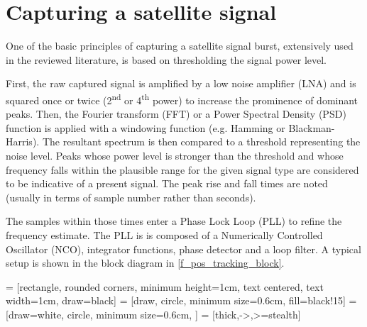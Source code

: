 \section{Capturing a satellite signal}
\label{s_pos_tracking_satellite}
One of the basic principles of capturing a satellite signal burst, extensively used in the reviewed literature, is based on thresholding the signal power level.

First, the raw captured signal is amplified by a low noise amplifier (LNA) and is squared once or twice (2\textsuperscript{nd} or 4\textsuperscript{th} power) to increase the prominence of dominant peaks. Then, the Fourier transform (FFT) or a Power Spectral Density (PSD) function is applied with a windowing function (e.g. Hamming or Blackman-Harris). The resultant spectrum is then compared to a threshold representing the noise level. Peaks whose power level is stronger than the threshold and whose frequency falls within the plausible range for the given signal type are considered to be indicative of a present signal. The peak rise and fall times are noted (usually in terms of sample number rather than seconds). 

The samples within those times enter a Phase Lock Loop (PLL) to refine the frequency estimate. The PLL is is composed of a Numerically Controlled Oscillator
(NCO), integrator functions, phase detector and a loop filter. A typical setup is shown in the block diagram in \autoref{f_pos_tracking_block}\cite{sop03, sop04, sop05}.

 = [rectangle, rounded corners, minimum height=1cm, text centered, text width=1cm, draw=black]
 = [draw, circle, minimum size=0.6cm, fill=black!15]
 = [draw=white, circle, minimum size=0.6cm, ]
 = [thick,->,>=stealth]

